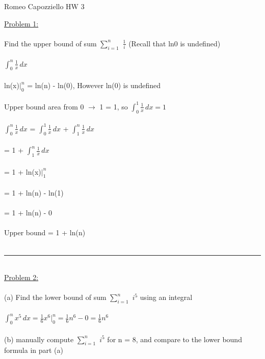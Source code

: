 \documentclass{article}
\begin{document}
    \begin{center}
        Romeo Capozziello HW 3
    \end{center}
    \underline{Problem 1:}\\\\
    Find the upper bound of sum $\sum_{i=1}^{n}$ $\frac{1}{i}$ (Recall that ln0 is undefined)\\
    \\
    \indent $\int_{0}^{n} \frac{1}{x} \,dx $\\\\
    \indent ln(x)$|_0^n$ = ln(n) - ln(0), However ln(0) is undefined\\\\
    \indent Upper bound area from 0 $\to$ 1 = 1, so $\int_{0}^{1} \frac{1}{x} \,dx = 1$\\\\
    \indent $\int_{0}^{n} \frac{1}{x} \,dx $ = $\int_{0}^{1} \frac{1}{x} \,dx $ + $\int_{1}^{n} \frac{1}{x} \,dx $\\\\
    \indent\hspace{1.2cm} = 1 + $\int_{1}^{n} \frac{1}{x} \,dx $\\\\
    \indent\hspace{1.2cm} = 1 + ln(x)$|_1^n$\\\\
    \indent\hspace{1.2cm} = 1 + ln(n) - ln(1)\\\\
    \indent\hspace{1.2cm} = 1 + ln(n) - 0\\\\
    \indent Upper bound = 1 + ln(n)\\
    \\
    \rule{\textwidth}{0.5pt}\\
    \underline{Problem 2:}\\\\
    (a) Find the lower bound of sum $\sum_{i=1}^n$ $i^5$ using an integral\\
    \\
    \indent $\int_{0}^{n} x^5 \,dx = \frac{1}{6}x^6|_0^n = \frac{1}{6}n^6 - 0 = \frac{1}{6}n^6$\\
    \\
    (b) manually compute $\sum_{i=1}^n$ $i^5$ for n = 8, and compare to the lower bound formula in part (a)\\
    \\
\end{document}

